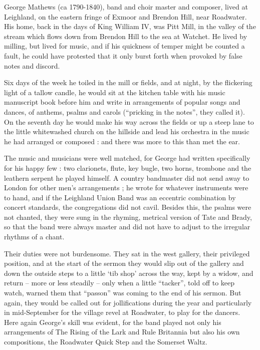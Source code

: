 George Mathews (ca 1790-1840), band and choir master and composer, lived at Leighland, on the eastern fringe of Exmoor and Brendon Hill, near Roadwater. His home, back in the days of King William IV, was Pitt Mill, in the valley of the stream which flows down from Brendon Hill to the sea at Watchet. He lived by milling, but lived for music, and if his quickness of temper might be counted a fault, he could have protested that it only burst forth when provoked by false notes and discord. 

Six days of the week he toiled in the mill or fields, and at night, by the flickering light of a tallow candle, he would sit at the kitchen table with his music manuscript book before him and write in arrangements of popular songs and dances, of anthems, psalms and carols (“pricking in the notes”, they called it). On the seventh day he would make his way across the fields or up a steep lane to the little whitewashed church on the hillside and lead his orchestra in the music he had arranged or composed : and there was more to this than met the ear. 

The music and musicians were well matched, for George had written specifically for his happy few : two clarionets, flute, key bugle, two horns, trombone and the leathern serpent he played himself. A country bandmaster did not send away to London for other men’s arrangements ; he wrote for whatever instruments were to hand, and if the Leighland Union Band was an eccentric combination by concert standards, the congregations did not cavil. Besides this, the psalms were not chanted, they were sung in the rhyming, metrical version of Tate and Brady, so that the band were always master and did not have to adjust to the irregular rhythms of a chant. 

Their duties were not burdensome. They sat in the west gallery, their privileged position, and at the start of the sermon they would slip out of the gallery and down the outside steps to a little ‘tib shop’ across the way, kept by a widow, and return – more or less steadily – only when a little “tacker”, told off to keep watch, warned them that “passon” was coming to the end of his sermon. But again, they would be called out for jollifications during the year and particularly in mid-September for the village revel at Roadwater, to play for the dancers. Here again George’s skill was evident, for the band played not only his arrangements of The Rising of the Lark and Rule Britannia but also his own compositions, the Roadwater Quick Step and the Somerset Waltz. 

